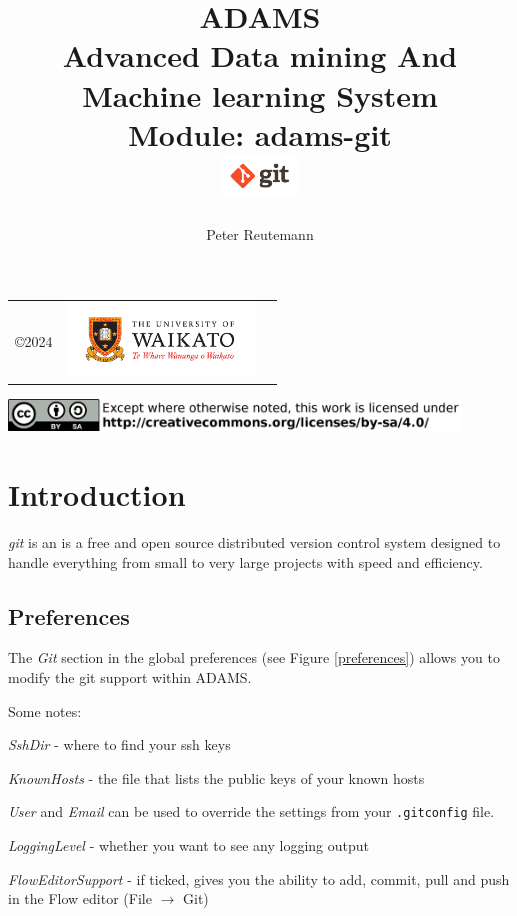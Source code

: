 \documentclass[a4paper]{book}
\title{
  \textbf{ADAMS} \\
  {\Large \textbf{A}dvanced \textbf{D}ata mining \textbf{A}nd \textbf{M}achine
  learning \textbf{S}ystem} \\
  {\Large Module: adams-git} \\
  \vspace{1cm}
  \includegraphics[width=2cm]{images/git-module.png} \\
}
\author{
  Peter Reutemann
}
\begin{document}
\begin{titlepage}
\maketitle

\thispagestyle{empty}
\center
\begin{table}[b]
	\begin{tabular}{c l l}
		\parbox[c][2cm]{2cm}{\copyright 2024} &
		\parbox[c][2cm]{5cm}{\includegraphics[width=5cm]{images/coat_of_arms.pdf}} \\
	\end{tabular}
	\includegraphics[width=12cm]{images/cc.png} \\
\end{table}

\end{titlepage}

\tableofcontents
\listoffigures


\chapter{Introduction}
\textit{git} is an is a free and open source distributed version control system designed to handle everything
from small to very large projects with speed and efficiency\cite{git}.

\section{Preferences}
The \textit{Git} section in the global preferences (see Figure \ref{preferences}) allows you to modify
the git support within ADAMS.

\noindent Some notes:
\begin{tight_itemize}
    \item \textit{SshDir} - where to find your ssh keys
    \item \textit{KnownHosts} - the file that lists the public keys of your known hosts
    \item \textit{User} and \textit{Email} can be used to override the settings from your \texttt{.gitconfig} file.
    \item \textit{LoggingLevel} - whether you want to see any logging output
    \item \textit{FlowEditorSupport} - if ticked, gives you the ability to add, commit, pull and push in the
    Flow editor (File $\rightarrow$ Git)
\end{tight_itemize}
\end{document}
